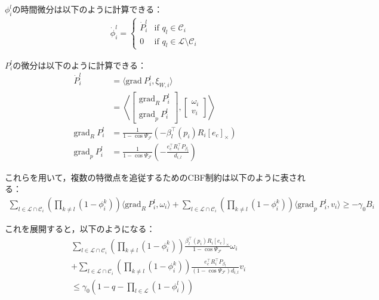 $\phi_i^l$の時間微分は以下のように計算できる：
\begin{equation}
\begin{aligned}
\dot{\phi}_i^l = 
\begin{cases}
\dot{P}_i^l & \text{if } q_l \in \mathcal{C}_i \\
0 & \text{if } q_l \in \mathcal{L} \setminus \mathcal{C}_i
\end{cases}
\label{eq:multi_probability_derivative}
\end{aligned}
\end{equation}

$P_i^l$の微分は以下のように計算できる：
\begin{equation}
\begin{aligned}
\dot{P}_i^l &= \langle \mathrm{grad}\:P_i^l, \xi_{W,i} \rangle \\
&= \left\langle 
\begin{bmatrix}
\mathrm{grad}_R\:P_i^l \\
\mathrm{grad}_p\:P_i^l
\end{bmatrix},
\begin{bmatrix}
\omega_i \\
v_i
\end{bmatrix}
\right\rangle \\
\mathrm{grad}_R\:P_i^l &= \frac{1}{1 - \cos\Psi_\mathcal{F}}(-\beta_l^\top(p_i) R_i [e_c]_\times) \\
\mathrm{grad}_p\:P_i^l &= \frac{1}{1 - \cos\Psi_\mathcal{F}}\left(-\frac{e_c^\top R_i^\top P_{\beta_l}}{d_{i,l}}\right)
\label{eq:visibility_probability_derivative}
\end{aligned}
\end{equation}

これらを用いて，複数の特徴点を追従するためのCBF制約は以下のように表される：
\begin{equation}
\begin{aligned}
\sum_{l \in \mathcal{L} \cap \mathcal{C}_i}\left(\prod_{k \neq l}(1 - \phi_i^k)\right) \langle \mathrm{grad}_R\:P_i^l, \omega_i \rangle + \sum_{l \in \mathcal{L} \cap \mathcal{C}_i}\left(\prod_{k \neq l}(1 - \phi_i^k)\right) \langle \mathrm{grad}_p\:P_i^l, v_i \rangle \geq -\gamma_0 B_i
\label{eq:multi_cbf_constraint}
\end{aligned}
\end{equation}

これを展開すると，以下のようになる：
\begin{equation}
\begin{aligned}
&\sum_{l \in \mathcal{L} \cap \mathcal{C}_i}\left(\prod_{k \neq l}(1 - \phi_i^k)\right) \frac{\beta_l^\top(p_i) R_i [e_c]_\times}{1 - \cos\Psi_\mathcal{F}}\omega_i \\
&+ \sum_{l \in \mathcal{L} \cap \mathcal{C}_i}\left(\prod_{k \neq l}(1 - \phi_i^k)\right) \frac{e_c^\top R_i^\top P_{\beta_l}}{(1 - \cos\Psi_\mathcal{F})d_{i,l}}v_i \\
&\leq \gamma_0 \left(1 - q - \prod_{l \in \mathcal{L}}(1 - \phi_i^l)\right)
\label{eq:multi_cbf_constraint_expanded}
\end{aligned}
\end{equation}

